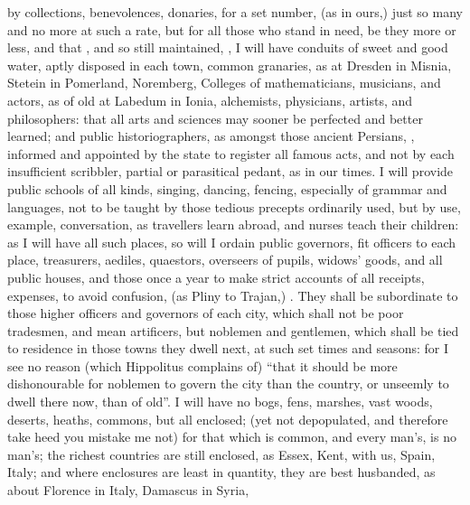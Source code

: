 by collections, benevolences, donaries, for a set number, (as in ours,) just so
many and no more at such a rate, but for all those who stand in need, be they
more or less, and that , and so still maintained,
, \etc{} I will have conduits of sweet and good
water, aptly disposed in each town, common granaries, as at
Dresden in Misnia, Stetein in Pomerland, Noremberg, \etc{} Colleges of
mathematicians, musicians, and actors, as of old at Labedum in Ionia,
alchemists, physicians, artists, and philosophers: that all
arts and sciences may sooner be perfected and better learned; and public
historiographers, as amongst those ancient Persians,
, informed
and appointed by the state to register all famous acts, and not by each
insufficient scribbler, partial or parasitical pedant, as in our times. I will
provide public schools of all kinds, singing, dancing, fencing, \etc{}
especially of grammar and languages, not to be taught by those tedious precepts
ordinarily used, but by use, example, conversation, as
travellers learn abroad, and nurses teach their children: as I will have all
such places, so will I ordain public governors, fit
officers to each place, treasurers, aediles, quaestors, overseers of pupils,
widows' goods, and all public houses, \etc{} and those once a year to make
strict accounts of all receipts, expenses, to avoid confusion,  (as Pliny to Trajan,) . They shall be
subordinate to those higher officers and governors of each city, which shall
not be poor tradesmen, and mean artificers, but noblemen and gentlemen, which
shall be tied to residence in those towns they dwell next, at such set times
and seasons: for I see no reason (which Hippolitus
complains of) \enquote{that it should be more dishonourable for noblemen to govern the
city than the country, or unseemly to dwell there now, than of old}.
I will have no bogs, fens, marshes, vast woods, deserts,
heaths, commons, but all enclosed; (yet not depopulated, and therefore take
heed you mistake me not) for that which is common, and every man's, is no
man's; the richest countries are still enclosed, as Essex, Kent, with us,
\etc{} Spain, Italy; and where enclosures are least in quantity, they are best
husbanded, as about Florence in Italy, Damascus in Syria,
